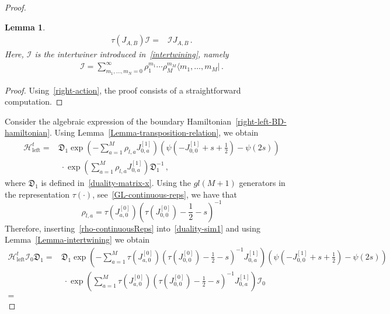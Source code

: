 \documentclass[11pt]{article}
\numberwithin{equation}{section}
\newtheorem{lemma}[theorem]{Lemma}
\newcommand{\M}{M}
\newcommand{\eH}{\mathcal{H}}
\newcommand{\eJ}{J}
\newcommand{\rep}{\tau}
\begin{document}
\begin{proof}
\begin{lemma}
		\begin{align}
			\rep(J_{A,B})\mathcal{I}=&\mathcal{I}\eJ_{A,B}\,.
		\end{align}
		Here, $\mathcal{I}$	is the intertwiner introduced in~\eqref{intertwining}, namely
		\begin{align}
			\mathcal{I}=\sum_{m_{1},\ldots,m_{N}=0}^{\infty}\rho_{1}^{m_{1}}\cdots \rho_{\M}^{m_{\M}}\langle m_{1},\ldots,m_{\M}|\,.
		\end{align}
	\end{lemma}
	\begin{proof}
 Using~\eqref{right-action}, the proof consists of a straightforward computation. 
    																																																																															\end{proof}  
    		         
	Consider the algebraic expression of the boundary Hamiltonian~\eqref{right-left-BD-hamiltonian}. 
        Using Lemma~\ref{Lemma-transposition-relation}, we obtain
    \begin{equation}\label{duality-sim1}
			\begin{split}
				\eH_{\text{left}}^{t}=&
				\mathfrak{D}_{1}\exp{\left(-\sum_{a=1}^{\M}\rho_{l,a}\eJ_{0,a}^{[1]}\right)}\left(\psi(-\eJ_{0,0}^{[1]}+s+\frac{1}{2})-\psi(2s)\right)
				\\&\;\cdot
				\exp{\left(\sum_{a=1}^{\M}\rho_{l,a}\eJ_{0,a}^{[1]}\right)}\mathfrak{D}_{1}^{-1}\,,
			\end{split}
		\end{equation}
		where $\mathfrak{D}_1$ is defined in~\eqref{duality-matrix-x}. 								Using the $gl(\M+1)$ generators in the representation $\rep(\cdot)$, see~\eqref{GL-continuous-reps}, we have that
	\begin{equation}\label{rho-continuousReps}
	\rho_{l,a} =\rep(J_{a,0}^{[0]})\left(\rep(J_{0,0}^{[0]})-\frac{1}{2}-s\right)^{-1}
	\end{equation}
	Therefore, inserting~\eqref{rho-continuousReps} into~\eqref{duality-sim1} and using Lemma~\ref{Lemma-intertwining} we obtain
 									\begin{equation}
		\begin{split}
			\eH_{\text{left}}^{t}\mathcal{I}_{0}\mathfrak{D}_{1}=&
            \mathfrak{D}_{1}\exp{\left(-\sum_{a=1}^{\M}\rep(J_{a,0}^{[0]})\left(\rep(J_{0,0}^{[0]})-\frac{1}{2}-s\right)^{-1}\eJ_{0,a}^{[1]}\right)}\left(\psi(-\eJ_{0,0}^{[1]}+s+\frac{1}{2})-\psi(2s)\right)
			\\&\;\cdot
			\exp{\left(\sum_{a=1}^{\M}\rep(J_{a,0}^{[0]})\left(\rep(J_{0,0}^{[0]})-\frac{1}{2}-s\right)^{-1}\eJ_{0,a}^{[1]}\right)}\mathcal{I}_{0}			\\=&

\end{split}
\end{equation}
\end{proof}
\end{document}
